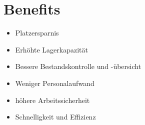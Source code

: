 \chapter{Benefits}
\begin{itemize}
	\item Platzersparnis
	\item Erhöhte Lagerkapazität
	\item Bessere Bestandskontrolle und -übersicht
	\item Weniger Personalaufwand
	\item höhere Arbeitssicherheit
	\item Schnelligkeit und Effizienz
\end{itemize}